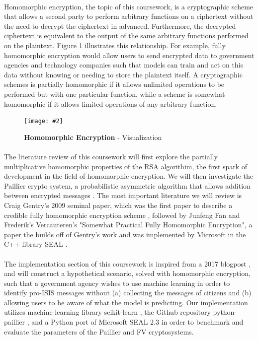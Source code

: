 \documentclass[10pt, a4paper]{article}
\newcommand{\figuremacro}[5]{
    \begin{figure}[#1]
        \centering
        \texttt{[image: \#2]}
        \caption[#3]{\textbf{#3}#4}
        \label{fig:#2}
    \end{figure}
}
\begin{document}
	\paragraph{}
	Homomorphic encryption, the topic of this coursework, is a cryptographic scheme that allows a second party to perform arbitrary functions on a ciphertext without the need to decrypt the ciphertext in advanced. Furthermore, the decrypted ciphertext is equivalent to the output of the same arbitrary functions performed on the plaintext. Figure 1 illustrates this relationship. For example, fully homomorphic encryption would allow users to send encrypted data to government agencies and technology companies such that models can train and act on this data without knowing or needing to store the plaintext itself.  A cryptographic schemes is partially homomorphic if it allows unlimited operations to be performed but with one particular function, while a scheme is somewhat homomorphic if it allows limited operations of any arbitrary function.
	   \figuremacro{h}{homomorphic_encryption}{Homomorphic Encryption}{ - Visualization}{1.0}
	\paragraph{}
	The literature review of this coursework will first explore the partially multiplicative homomorphic properties of the RSA algorithim, the first spark of development in the field of homomorphic encryption. We will then investigate the Paillier crypto system, a probabilistic asymmetric algorithm that allows addition between encrypted messages \cite{paillier1999public}. The most important literature we will review is Craig Gentry's 2009 seminal paper, which was the first paper to describe a credible fully homomorphic encryption scheme \cite{gentry2009fully}, followed by Junfeng Fan and Frederik's Vercauteren's "Somewhat Practical Fully Homomorphic Encryption", a paper the builds off of Gentry's work and was implemented by Microsoft in the C++ library SEAL \cite{sealcrypto}. 
	\paragraph{}
	The implementation section of this coursework is inspired from a 2017 blogpost \cite{iamtrask:2017}, and will construct a hypothetical scenario, solved with homomorphic encryption, such that a government agency wishes to use machine learning in order to identify pro-ISIS messages without (a) collecting the messages of citizens and (b) allowing users to be aware of what the model is predicting. Our implementation utilizes machine learning library scikit-learn \cite{scikit-learn}, the Github repository python-paillier \cite{python-paillier}, and a Python port \cite{PySEAL} of Microsoft SEAL 2.3 \cite{sealcrypto} in order to benchmark and evaluate the parameters of the Paillier and FV cryptosystems.  
    
\end{document}
